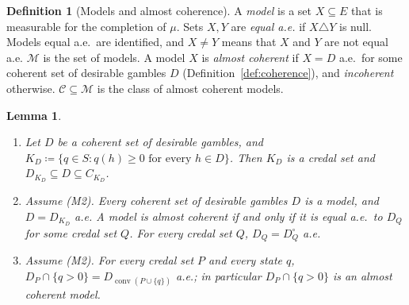 \documentclass[11pt]{article}
\newtheorem{lemma}[theorem]{Lemma}
\theoremstyle{definition}
\newtheorem{definition}[theorem]{Definition}
\newcommand{\M}{\mathcal M}
\newcommand{\C}{\mathcal C}
\DeclareMathOperator{\conv}{conv}
\begin{document}
\begin{definition}[Models and almost coherence]\label{def:models}
A \emph{model} is a set $X\subseteq E$ that is measurable for the completion of $\mu$. Sets $X,Y$ are \emph{equal a.e.} if $X\triangle Y$ is null. Models equal a.e.\ are identified, and $X\ne Y$ means that $X$ and $Y$ are not equal a.e. $\M$ is the set of models. A model $X$ is \emph{almost coherent} if $X=D$ a.e.\ for some coherent set of desirable gambles $D$ (Definition~\ref{def:coherence}), and \emph{incoherent} otherwise. $\C\subseteq\M$ is the class of almost coherent models.
\end{definition}

\begin{lemma}\label{lem:identify}
\begin{enumerate}[label=(\alph*)]
\item Let $D$ be a coherent set of desirable gambles, and $K_D\coloneqq\{q\in S:q(h)\ge0\text{ for every }h\in D\}$. Then $K_D$ is a credal set and $D_{K_D}\subseteq D\subseteq C_{K_D}$.
\item Assume (M2). Every coherent set of desirable gambles $D$ is a model, and $D=D_{K_D}$ a.e. A model is almost coherent if and only if it is equal a.e.\ to $D_Q$ for some credal set $Q$. For every credal set $Q$, $D_Q=D^\circ_Q$ a.e.
\item Assume (M2). For every credal set $P$ and every state $q$, $D_P\cap\{q>0\}=D_{\conv(P\cup\{q\})}$ a.e.; in particular $D_P\cap\{q>0\}$ is an almost coherent model.
\end{enumerate}
\end{lemma}
\end{document}
